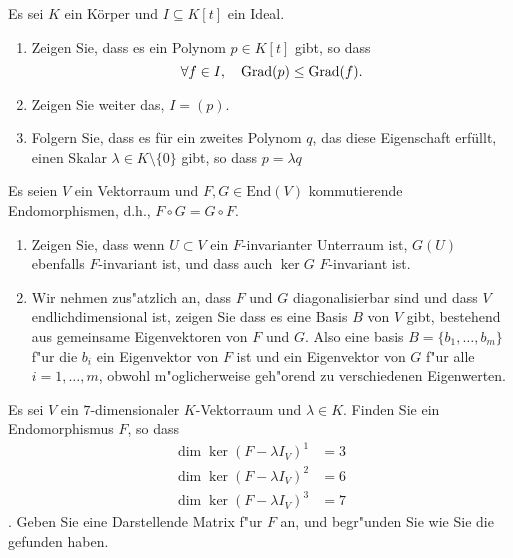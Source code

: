 \documentclass[a4,11pt]{article}
\begin{document}
\vspace*{-17mm}
{
\kopf
}


\begin{aufgabe}[4 Punkte]
Es sei $K$ ein K\"orper und $I \subseteq K[t]$ ein Ideal.

\begin{enumerate}
\item Zeigen Sie, dass es ein Polynom $p \in K[t]$ gibt, so dass
\[
\forall f \in I, \quad \operatorname{Grad} (p) \leq \operatorname{Grad} (f).
\]
\item Zeigen Sie weiter das, $I = (p)$.
\item Folgern Sie, dass es f\"ur ein zweites Polynom $q$, das diese Eigenschaft erf\"ullt, einen Skalar $\lambda \in K \setminus \{0\}$ gibt, so dass $p = \lambda q$
\end{enumerate}

\end{aufgabe}

\begin{aufgabe}[4 Punkte]

Es seien $V$ ein Vektorraum und $F, G \in \text{End}(V)$ kommutierende Endomorphismen, d.h., $F \circ G = G \circ F$.
\begin{enumerate}
\item
Zeigen Sie, dass wenn $U \subset V$ ein $F$-invarianter Unterraum ist, $G(U)$ ebenfalls $F$-invariant ist, und dass auch $\ker G$  $F$-invariant ist.

\item Wir nehmen zus"atzlich an, dass  $F$ und $G$ diagonalisierbar sind und dass $V$ endlichdimensional ist, zeigen Sie dass es eine Basis $B$ von $V$ gibt, bestehend aus gemeinsame Eigenvektoren von $F$ und $G$. Also eine basis $B = \{ b_1, \dots , b_m\}$ f"ur die $b_i$ ein Eigenvektor von $F$ ist und ein Eigenvektor von $G$ f"ur alle $i = 1, \dots , m$, obwohl m"oglicherweise geh"orend zu verschiedenen Eigenwerten.
\end{enumerate}
\end{aufgabe}


\begin{aufgabe}[4 Punkte]
Es sei $V$ ein $7$-dimensionaler $K$-Vektorraum und $\lambda \in K$. Finden Sie ein Endomorphismus $F$, so dass
\begin{align*}
\dim \ker (F -\lambda I_V)^1 &= 3\\
\dim \ker (F -\lambda I_V)^2 &= 6 \\
\dim \ker (F -\lambda I_V)^3 &= 7
\end{align*}.
Geben Sie eine Darstellende Matrix f"ur $F$ an, und begr"unden Sie wie Sie die gefunden haben.
\end{aufgabe}
\end{document}
